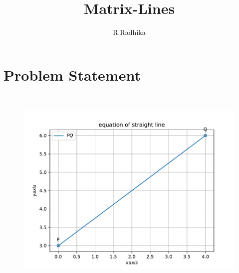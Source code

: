 \documentclass[journal,12pt,twocolumn]{IEEEtran}
\title{
Matrix-Lines
}
\author{R.Radhika}
\begin{document}
\maketitle
\tableofcontents
\bigskip
\section{Problem Statement}
\fi
\\
\solution 
	\begin{figure}[!ht]
		\centering
 \includegraphics[width=\columnwidth]{chapters/11/10/1/12/figs/figure.pdf}
		\caption{}
		\label{fig:11/10/1/12}
  	\end{figure}
\iffalse
\end{document}

